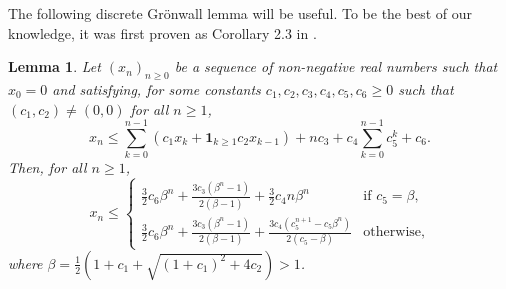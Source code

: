 \documentclass[11pt]{article}
\numberwithin{equation}{section}
\newtheorem{lemma}[theorem]{Lemma}
\theoremstyle{definition}
\theoremstyle{remark}
\begin{document}
The following discrete Gr\"onwall lemma will be useful. To be the best of our knowledge, it was first proven as Corollary 2.3 in \cite{hutzenthaler2022multilevel}.
\begin{lemma}
    \label{lemma:discrete-gronwall}
    Let $(x_n)_{n \geq 0}$ be a sequence of non-negative real numbers such that $x_0=0$ and satisfying, for some constants $c_1, c_2, c_3, c_4, c_5, c_6 \geq 0$ such that $(c_1,c_2) \neq (0,0)$ for all $n \geq 1$,
    \[
    x_n \leq  \sum_{k=0}^{n-1} \left(c_1 x_{k} +  \mathbf 1_{k \geq 1} c_2 x_{k-1} \right) + n c_3 + c_4 \sum_{k=0}^{n-1}c_5^k + c_6. 
    \]
Then, for all $n \geq 1$,
    \[
    x_n \leq \begin{cases}
        \frac{3}{2}c_6  \beta^n +\frac{3 c_3(\beta^n - 1)}{2(\beta - 1)} + \frac{3}{2} c_4 n  \beta^n & \text{if } c_5 = \beta, \\
        \frac{3}{2}c_6  \beta^n +\frac{3 c_3(\beta^n - 1)}{2(\beta - 1)} + \frac{3 c_4 (c_5^{n+1} - c_5 \beta^n)}{2 (c_5 - \beta)} & \text{otherwise},
    \end{cases}
    \]
where $\beta = \frac{1}{2}\left(1 + c_1 + \sqrt{(1 + c_1)^2 + 4c_2} \right) > 1$.   
\end{lemma}
\end{document}
